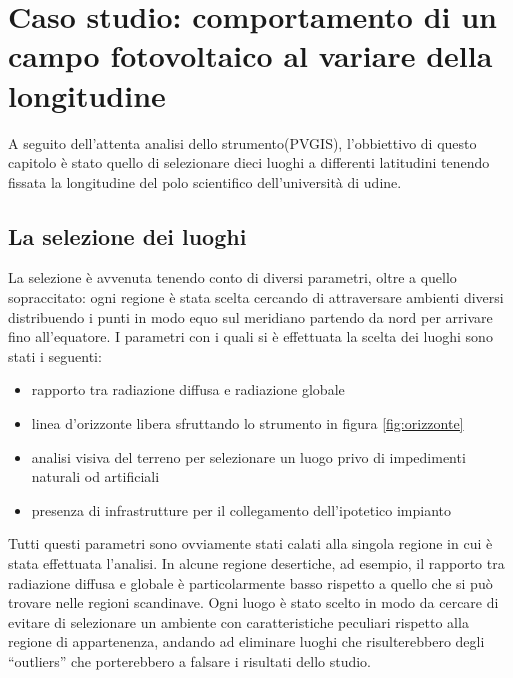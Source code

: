 
\chapter{Caso studio: comportamento di un campo fotovoltaico al variare della longitudine}
\label{chp:Caso studio: comportamento di un campo fotovoltaico al variare della longitudine}
A seguito dell'attenta analisi dello strumento(PVGIS), l'obbiettivo di questo capitolo è stato quello di selezionare dieci luoghi a differenti latitudini tenendo fissata la longitudine del polo scientifico dell'università di udine.
\section{La selezione dei luoghi}
La selezione è avvenuta tenendo conto di diversi parametri, oltre a quello sopraccitato: ogni regione è stata scelta cercando di attraversare ambienti diversi distribuendo i punti in modo equo sul meridiano partendo da nord per arrivare fino all'equatore.
I parametri con i quali si è effettuata la scelta dei luoghi sono stati i seguenti:
\begin{itemize}
    \item rapporto tra radiazione diffusa e radiazione globale
    \item linea d'orizzonte libera sfruttando lo strumento in figura \ref{fig:orizzonte}
    \item analisi visiva del terreno per selezionare un luogo privo di impedimenti naturali od artificiali
    \item presenza di infrastrutture per il collegamento dell'ipotetico impianto
\end{itemize}
\noindent
Tutti questi parametri sono ovviamente stati calati alla singola regione in cui è stata effettuata l'analisi. In alcune regione desertiche, ad esempio, il rapporto tra radiazione diffusa e globale è particolarmente basso rispetto a quello che si può trovare nelle regioni scandinave.
Ogni luogo è stato scelto in modo da cercare di evitare di selezionare un ambiente con caratteristiche peculiari rispetto alla regione di appartenenza, andando ad eliminare luoghi che risulterebbero degli \enquote{outliers} che porterebbero a falsare i risultati dello studio.
